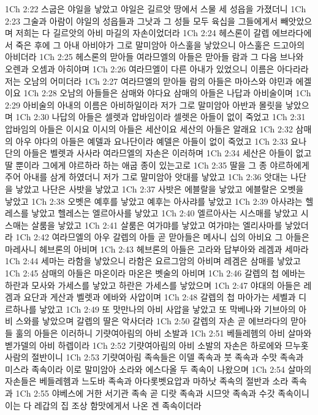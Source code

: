 1Ch 2:22  스굽은 야일을 낳았고 야일은 길르앗 땅에서 스물 세 성읍을 가졌더니
1Ch 2:23  그술과 아람이 야일의 성읍들과 그낫과 그 성들 모두 육십을 그들에게서 빼앗았으며 저희는 다 길르앗의 아비 마길의 자손이었더라
1Ch 2:24  헤스론이 갈렙 에브라다에서 죽은 후에 그 아내 아비야가 그로 말미암아 아스훌을 낳았으니 아스훌은 드고아의 아비더라
1Ch 2:25  헤스론의 맏아들 여라므엘의 아들은 맏아들 람과 그 다음 브나와 오렌과 오셈과 아히야며
1Ch 2:26  여라므엘이 다른 아내가 있었으니 이름은 아다라라 저는 오남의 어미더라
1Ch 2:27  여라므엘의 맏아들 람의 아들은 마아스와 야민과 에겔이요
1Ch 2:28  오남의 아들들은 삼매와 야다요 삼매의 아들은 나답과 아비술이며
1Ch 2:29  아비술의 아내의 이름은 아비하일이라 저가 그로 말미암아 아반과 몰릿을 낳았으며
1Ch 2:30  나답의 아들은 셀렛과 압바임이라 셀렛은 아들이 없이 죽었고
1Ch 2:31  압바임의 아들은 이시요 이시의 아들은 세산이요 세산의 아들은 알래요
1Ch 2:32  삼매의 아우 야다의 아들은 예델과 요나단이라 예델은 아들이 없이 죽었고
1Ch 2:33  요나단의 아들은 벨렛과 사사라 여라므엘의 자손은 이러하며
1Ch 2:34  세산은 아들이 없고 딸 뿐이라 그에게 야르하라 하는 애굽 종이 있는고로
1Ch 2:35  딸을 그 종 야르하에게 주어 아내를 삼게 하였더니 저가 그로 말미암아 앗대를 낳았고
1Ch 2:36  앗대는 나단을 낳았고 나단은 사밧을 낳았고
1Ch 2:37  사밧은 에블랄을 낳았고 에블랄은 오벳을 낳았고
1Ch 2:38  오벳은 예후를 낳았고 예후는 아사랴를 낳았고
1Ch 2:39  아사랴는 헬레스를 낳았고 헬레스는 엘르아사를 낳았고
1Ch 2:40  엘르아사는 시스매를 낳았고 시스매는 살룸을 낳았고
1Ch 2:41  살룸은 여가먀를 낳았고 여가먀는 엘리사마를 낳았더라
1Ch 2:42  여라므엘의 아우 갈렙의 아들 곧 맏아들은 메사니 십의 아비요 그 아들은 마레사니 헤브론의 아비며
1Ch 2:43  헤브론의 아들은 고라와 답부아와 레겜과 세마라
1Ch 2:44  세마는 라함을 낳았으니 라함은 요르그암의 아비며 레겜은 삼매를 낳았고
1Ch 2:45  삼매의 아들은 마온이라 마온은 벳술의 아비며
1Ch 2:46  갈렙의 첩 에바는 하란과 모사와 가세스를 낳았고 하란은 가세스를 낳았으며
1Ch 2:47  야대의 아들은 레겜과 요단과 게산과 벨렛과 에바와 사압이며
1Ch 2:48  갈렙의 첩 마아가는 세벨과 디르하나를 낳았고
1Ch 2:49  또 맛만나의 아비 사압을 낳았고 또 막베나와 기브아의 아비 스와를 낳았으며 갈렙의 딸은 악사더라
1Ch 2:50  갈렙의 자손 곧 에브라다의 맏아들 훌의 아들은 이러하니 기럇여아림의 아비 소발과
1Ch 2:51  베들레헴의 아비 살마와 벧가델의 아비 하렙이라
1Ch 2:52  기럇여아림의 아비 소발의 자손은 하로에와 므누홋 사람의 절반이니
1Ch 2:53  기럇여아림 족속들은 이델 족속과 붓 족속과 수맛 족속과 미스라 족속이라 이로 말미암아 소라와 에스다올 두 족속이 나왔으며
1Ch 2:54  살마의 자손들은 베들레헴과 느도바 족속과 아다롯벳요압과 마하낫 족속의 절반과 소라 족속과
1Ch 2:55  야베스에 거한 서기관 족속 곧 디랏 족속과 시므앗 족속과 수갓 족속이니 이는 다 레갑의 집 조상 함맛에게서 나온 겐 족속이더라

